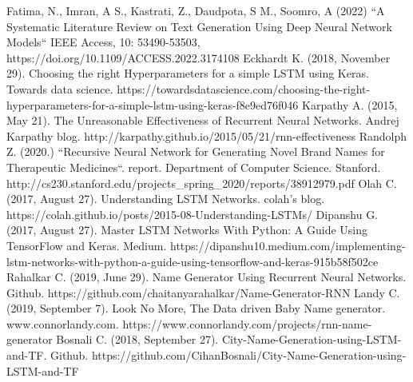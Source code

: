 \documentclass[conference]{IEEEtran}
\begin{document}
\begin{thebibliography}{00}
 Fatima, N., Imran, A S., Kastrati, Z., Daudpota, S M., Soomro, A (2022) ``A Systematic Literature Review on Text Generation Using Deep Neural Network Models``
IEEE Access, 10: 53490-53503, https://doi.org/10.1109/ACCESS.2022.3174108
 Eckhardt K. (2018, November 29). Choosing the right Hyperparameters for a simple LSTM using Keras. Towards data science. https://towardsdatascience.com/choosing-the-right-hyperparameters-for-a-simple-lstm-using-keras-f8e9ed76f046
 Karpathy A. (2015, May 21). The Unreasonable Effectiveness of Recurrent Neural Networks. Andrej Karpathy blog. http://karpathy.github.io/2015/05/21/rnn-effectiveness
 Randolph Z. (2020.) ``Recursive Neural Network for Generating Novel
Brand Names for Therapeutic Medicines``. report. Department of Computer Science. Stanford. http://cs230.stanford.edu/projects\_spring\_2020/reports/38912979.pdf
 Olah C. (2017, August 27). Understanding LSTM Networks. colah's blog. https://colah.github.io/posts/2015-08-Understanding-LSTMs/
 Dipanshu G. (2017, August 27). Master LSTM Networks With Python: A Guide Using TensorFlow and Keras. Medium. https://dipanshu10.medium.com/implementing-lstm-networks-with-python-a-guide-using-tensorflow-and-keras-915b58f502ce
 Rahalkar C. (2019, June 29). Name Generator Using Recurrent Neural Networks. Github. https://github.com/chaitanyarahalkar/Name-Generator-RNN
 Landy C. (2019, September 7). Look No More, The Data driven Baby Name generator. www.connorlandy.com. https://www.connorlandy.com/projects/rnn-name-generator
 Bosnali C. (2018, September 27). City-Name-Generation-using-LSTM-and-TF. Github. https://github.com/CihanBosnali/City-Name-Generation-using-LSTM-and-TF


\end{thebibliography}
\end{document}
